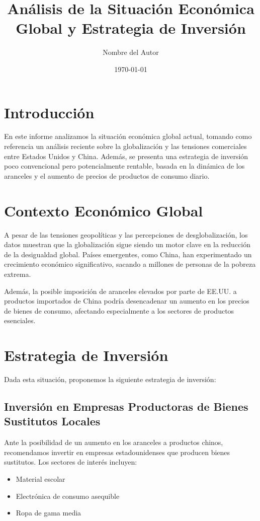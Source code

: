 \documentclass[a4paper,12pt]{article}
\title{Análisis de la Situación Económica Global y Estrategia de Inversión}
\author{Nombre del Autor}
\date{\today}
\begin{document}
\maketitle

\section{Introducción}
En este informe analizamos la situación económica global actual, tomando como referencia un análisis reciente sobre la globalización y las tensiones comerciales entre Estados Unidos y China. Además, se presenta una estrategia de inversión poco convencional pero potencialmente rentable, basada en la dinámica de los aranceles y el aumento de precios de productos de consumo diario.

\section{Contexto Económico Global}
A pesar de las tensiones geopolíticas y las percepciones de desglobalización, los datos muestran que la globalización sigue siendo un motor clave en la reducción de la desigualdad global. Países emergentes, como China, han experimentado un crecimiento económico significativo, sacando a millones de personas de la pobreza extrema.

Además, la posible imposición de aranceles elevados por parte de EE.UU. a productos importados de China podría desencadenar un aumento en los precios de bienes de consumo, afectando especialmente a los sectores de productos esenciales.

\section{Estrategia de Inversión}
Dada esta situación, proponemos la siguiente estrategia de inversión:

\subsection{Inversión en Empresas Productoras de Bienes Sustitutos Locales}
Ante la posibilidad de un aumento en los aranceles a productos chinos, recomendamos invertir en empresas estadounidenses que producen bienes sustitutos. Los sectores de interés incluyen:
\begin{itemize}
    \item Material escolar
    \item Electrónica de consumo asequible
    \item Ropa de gama media
\end{itemize}
\end{document}
